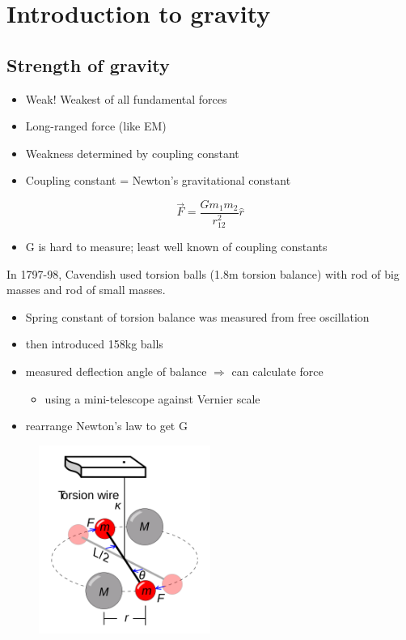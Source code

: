 \documentclass[a4paper]{article} %
\begin{document}
\begin{enumerate}
\end{enumerate}


\section{Introduction to gravity}
\subsection{Strength of gravity}
\begin{itemize}
\item Weak! Weakest of all fundamental forces
\item Long-ranged force (like EM)
\item Weakness determined by coupling constant
\item Coupling constant = Newton's gravitational constant
\end{itemize}
\begin{equation}
\vec{F}=\frac{Gm_1 m_2}{r_{12}^2}\hat{r}
\end{equation}
\begin{itemize}
\item G is hard to measure; least well known of coupling constants
\end{itemize}
In 1797-98, Cavendish used torsion balls (1.8m torsion balance) with rod of big masses and rod of small masses. 
\begin{itemize}
\item Spring constant of torsion balance was measured from free oscillation
\item then introduced 158kg balls
\item measured deflection angle of balance $\Rightarrow$ can calculate force
\begin{itemize}
\item using a mini-telescope against Vernier scale
\end{itemize}
\item rearrange Newton's law to get G
\end{itemize}

\begin{figure}[h]
\centering
\includegraphics[width=0.5\textwidth]{images/cavendish-torsion-balance.png}
\end{figure}
\end{document}
